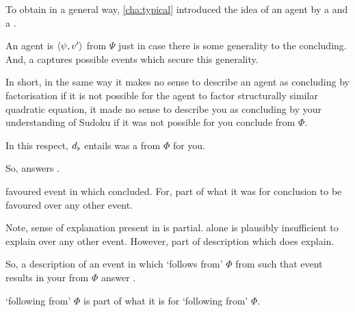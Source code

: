 \begin{note}
  \color{blue}
  To obtain  in a general way, \autoref{cha:typical} introduced the idea of an agent \tCV{} by a \torN{} and a \tprof{}.

  An agent is \tCV{} \(\langle\psi, v'\rangle\) from \(\Psi\) just in case there is some generality to the \agents{} concluding.
  And, a \tpro{} captures possible events which secure this generality.


  In short, in the same way it makes no sense to describe an agent as concluding by factorisation if it is not possible for the agent to factor structurally similar quadratic equation, it made no sense to describe you as concluding by your understanding of Sudoku if it was not possible for you conclude  from \(\Phi\).

  In this respect, \(d\sb{\flat}\) entails  was a \fc{} from \(\Phi\) for you.
\end{note}


\begin{note}
  So, answers \qWhy{}.
\end{note}


\begin{note}
  \ros{} favoured event in which concluded.
  For, part of what it was for conclusion to be favoured over any other event.


  Note, sense of explanation present in \qWhy{} is partial.
  \ros{} alone is plausibly insufficient to explain over any other event.
  However, part of description which does explain.
\end{note}


\begin{note}
  So, a description of an event in which  `follows from' \(\Phi\) from  such that event results in your  from \(\Phi\) answer \qWhy{}.


   `following from' \(\Phi\) is part of what it is for  `following from' \(\Phi\).
\end{note}



